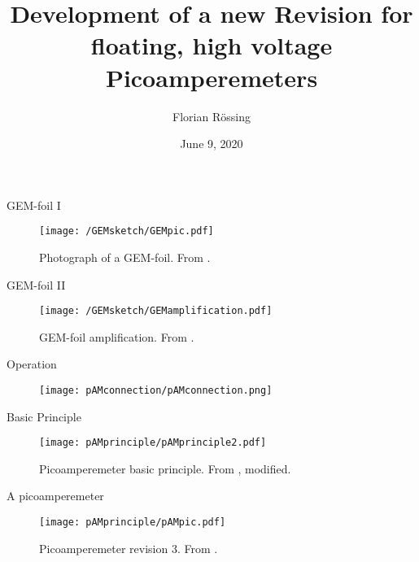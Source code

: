 \documentclass[t]{beamer}
\title{Development of a new Revision for floating, high voltage Picoamperemeters}
\author{Florian Rössing}
\date{June 9, 2020}
\begin{document}
\begin{frame}{\color{white}{.} }
\maketitle
\end{frame}

\begin{frame}[c]{GEM-foil I}
	\centering
	\begin{figure}
		\texttt{[image: /GEMsketch/GEMpic.pdf]}
		\caption{Photograph of a GEM-foil. From \cite{sauligas}.}
	\end{figure}
\end{frame}

\begin{frame}[c]{GEM-foil II}
	\centering
	\begin{figure}
		\texttt{[image: /GEMsketch/GEMamplification.pdf]}
		\caption{GEM-foil amplification. From \cite{gemamplification}.}
	\end{figure}
\end{frame}

\begin{frame}[c]{Operation}
\centering
\begin{figure}
	\texttt{[image: pAMconnection/pAMconnection.png]}
\end{figure}
\end{frame}

\begin{frame}[c]{Basic Principle}
		\centering
	\begin{figure}
		\texttt{[image: pAMprinciple/pAMprinciple2.pdf]}
		\caption{Picoamperemeter basic principle. From \cite{roedel}, modified.}
	\end{figure}
\end{frame}
\begin{frame}[c,noframenumbering]{A picoamperemeter}
	\centering
	\begin{figure}
		\texttt{[image: pAMprinciple/pAMpic.pdf]}
		\caption{Picoamperemeter revision 3. From \cite{rudolph}.}
	\end{figure}
\end{frame}
\end{document}
